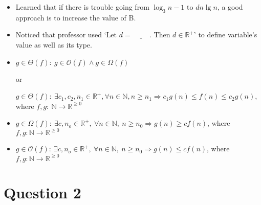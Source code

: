 \documentclass[12pt]{article}
\begin{document}
\bigskip

\begin{itemize}
    \item Learned that if there is trouble going from $\log_3n - 1$ to $dn\lg n$,
    a good approach is to increase the value of B.
    \item Noticed that professor used `Let $d = \underline{\hspace{1cm}}$. Then $d \in \mathbb{R}^+$'
    to define variable's value as well as its type.
    \item
    $g \in \Theta(f):\: g \in \mathcal{O}(f) \land g \in \Omega(f)$

    or

    $g \in \Theta(f):\:\exists c_1,c_2,n_1 \in \mathbb{R}^{+}, \forall n \in \mathbb{N}, n \geq n_1
    \Rightarrow c_1g(n) \leq f(n) \leq c_2g(n)$, where $f,g:\:\mathbb{N} \to \mathbb{R}^{\geq 0}$

    \item
    $g \in \Omega(f):\:\exists c,n_o \in \mathbb{R}^{+},\:\forall n \in
    \mathbb{N},\:n \geq n_0 \Rightarrow g(n) \geq cf(n)$, where $f,g:\mathbb{N} \to \mathbb{R}^{\geq 0}$

    \item

    $g \in \mathcal{O}(f):\:\exists c,n_o \in \mathbb{R}^{+},\:\forall n \in
    \mathbb{N},\:n \geq n_0 \Rightarrow g(n) \leq cf(n)$, where $f,g:\mathbb{N} \to \mathbb{R}^{\geq 0}$
\end{itemize}

\bigskip

\section*{Question 2}
\end{document}
